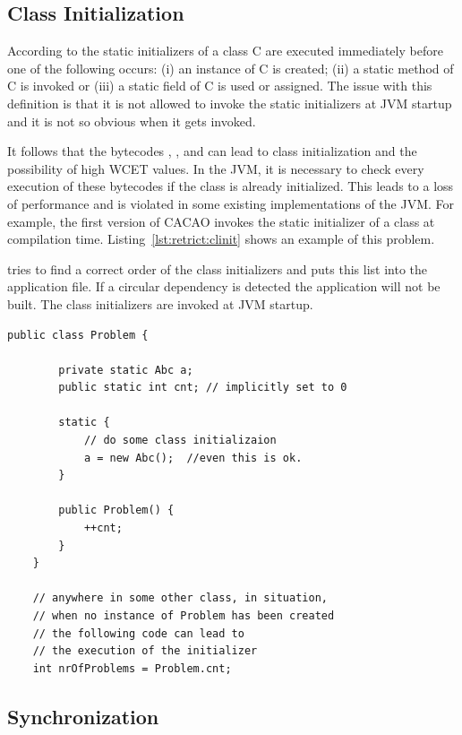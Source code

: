 \subsection{Class Initialization}
\label{para:restrict:clinit}



According to \cite{jvm} the static initializers of a class C are
executed immediately before one of the following occurs: (i) an
instance of C is created; (ii) a static method of C is invoked or
(iii) a static field of C is used or assigned. The issue with this
definition is that it is not allowed to invoke the static
initializers at JVM startup and it is not so obvious when it gets
invoked.

It follows that the bytecodes , ,
 and  can lead to class initialization
and the possibility of high WCET values. In the JVM, it is necessary
to check every execution of these bytecodes if the class is already
initialized. This leads to a loss of performance and is violated in
some existing implementations of the JVM. For example, the first
version of CACAO \cite{cacao} invokes the static initializer of a
class at compilation time. Listing~\ref{lst:retrict:clinit} shows an
example of this problem.

 tries to find a correct order of the class initializers
and puts this list into the application file. If a circular
dependency is detected the application will not be built. The class
initializers are invoked at JVM startup.

\begin{lstlisting}[float=t,caption={Class initialization can occur very late},
label=lst:retrict:clinit]
    public class Problem {

        private static Abc a;
        public static int cnt; // implicitly set to 0

        static {
            // do some class initializaion
            a = new Abc();  //even this is ok.
        }

        public Problem() {
            ++cnt;
        }
    }

    // anywhere in some other class, in situation,
    // when no instance of Problem has been created
    // the following code can lead to
    // the execution of the initializer
    int nrOfProblems = Problem.cnt;
\end{lstlisting}

\subsection{Synchronization}

